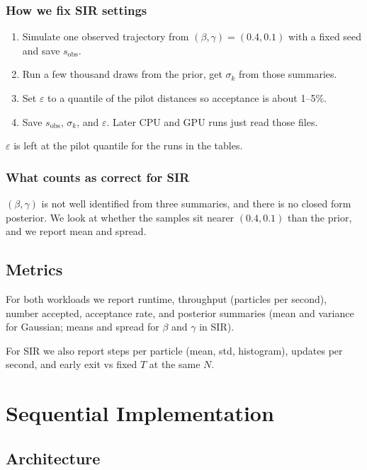 \documentclass[conference]{IEEEtran}
\begin{document}
\subsubsection{How we fix SIR settings}

\begin{enumerate}
    \item Simulate one observed trajectory from
          $(\beta, \gamma) = (0.4, 0.1)$ with a fixed seed and save
          $s_{\mathrm{obs}}$.
    \item Run a few thousand draws from the prior, get $\sigma_k$ from those
          summaries.
    \item Set $\varepsilon$ to a quantile of the pilot distances so acceptance
          is about 1--5\%.
    \item Save $s_{\mathrm{obs}}$, $\sigma_k$, and $\varepsilon$. Later CPU
          and GPU runs just read those files.
\end{enumerate}
$\varepsilon$ is left at the pilot quantile for the runs in the tables.

\subsubsection{What counts as correct for SIR}

$(\beta, \gamma)$ is not well identified from three summaries, and there is no
closed form posterior. We look at whether the samples sit nearer $(0.4, 0.1)$
than the prior, and we report mean and spread.

\subsection{Metrics}

For both workloads we report runtime, throughput (particles per second),
number accepted, acceptance rate, and posterior summaries (mean and variance
for Gaussian; means and spread for $\beta$ and $\gamma$ in SIR).

For SIR we also report steps per particle (mean, std, histogram), updates per
second, and early exit vs fixed $T$ at the same $N$.

\section{Sequential Implementation}

\subsection{Architecture}
\end{document}
